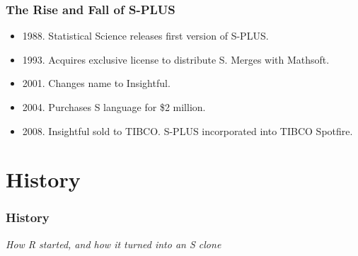 \documentclass[svgnames, aspectratio=169]{beamer}
\begin{document}
\begin{frame}
  \frametitle{The Rise and Fall of S-PLUS}
    
  \begin{itemize}
  \item 1988. Statistical Science releases first version of S-PLUS.
  \item 1993. Acquires exclusive license to distribute S. Merges with Mathsoft.
  \item 2001. Changes name to Insightful.
  \item 2004. Purchases S language for \$2 million.
  \item 2008. Insightful sold to TIBCO. S-PLUS incorporated into TIBCO Spotfire.
  \end{itemize}

\end{frame}

\section{History}

\begin{frame}
  \frametitle{History}

  \begin{center}
    {\em How R started, and how it turned into an S clone}
  \end{center}

\end{frame}
\end{document}
